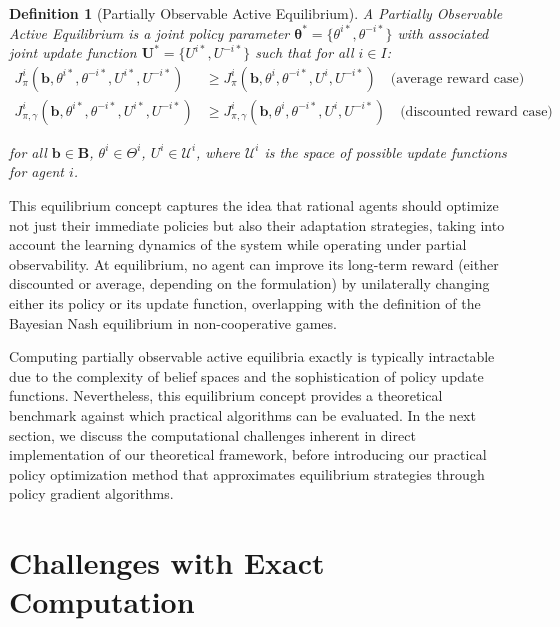 \documentclass[a4paper,12pt]{report}
\newtheorem{definition}{Definition}
\begin{document}
\begin{definition}[Partially Observable Active Equilibrium]
    A Partially Observable Active Equilibrium is a joint policy parameter $\boldsymbol{\theta}^* = \{\theta^{i*}, \theta^{-i*}\}$ with associated joint update function $\boldsymbol{U}^* = \{U^{i*}, U^{-i*}\}$ such that for all $i \in I$:
    \begin{align}
        J^i_{\pi}(\boldsymbol{b}, \theta^{i*}, \theta^{-i*}, U^{i*}, U^{-i*})         & \geq J^i_{\pi}(\boldsymbol{b}, \theta^i, \theta^{-i*}, U^i, U^{-i*}) \quad \text{(average reward case)}              \\
        J^i_{\pi, \gamma}(\boldsymbol{b}, \theta^{i*}, \theta^{-i*}, U^{i*}, U^{-i*}) & \geq J^{i}_{\pi, \gamma}(\boldsymbol{b}, \theta^i, \theta^{-i*}, U^i, U^{-i*}) \quad \text{(discounted reward case)}
    \end{align}

    for all $\boldsymbol{b} \in \boldsymbol{B}$, $\theta^i \in \Theta^i$, $U^i \in \mathcal{U}^i$, where $\mathcal{U}^i$ is the space of possible update functions for agent $i$.
\end{definition}

This equilibrium concept captures the idea that rational agents should optimize not just their immediate policies but also their adaptation strategies, taking into account the learning dynamics of the system while operating under partial observability. At equilibrium, no agent can improve its long-term reward (either discounted or average, depending on the formulation) by unilaterally changing either its policy or its update function, overlapping with the definition of the Bayesian Nash equilibrium in non-cooperative games.

Computing partially observable active equilibria exactly is typically intractable due to the complexity of belief spaces and the sophistication of policy update functions. Nevertheless, this equilibrium concept provides a theoretical benchmark against which practical algorithms can be evaluated. In the next section, we discuss the computational challenges inherent in direct implementation of our theoretical framework, before introducing our practical policy optimization method that approximates equilibrium strategies through policy gradient algorithms.

\section{Challenges with Exact Computation}
\end{document}

